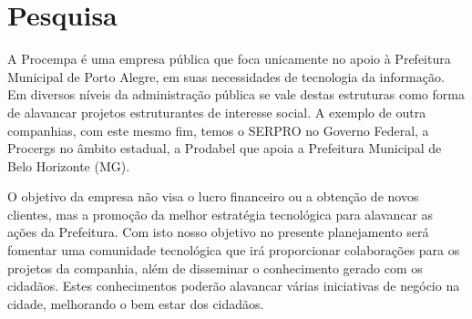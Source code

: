 \chapter{Pesquisa}
A Procempa é uma empresa pública que foca unicamente no apoio à Prefeitura Municipal de Porto Alegre, em suas necessidades de tecnologia da informação. Em diversos níveis da administração pública se vale destas estruturas como forma de alavancar projetos estruturantes de interesse social. A exemplo de outra companhias, com este mesmo fim, temos o SERPRO no Governo Federal, a Procergs no âmbito estadual, a Prodabel que apoia a Prefeitura Municipal de Belo Horizonte (MG).

O objetivo da empresa não visa o lucro financeiro ou a obtenção de novos clientes, mas a promoção da melhor estratégia tecnológica para alavancar as ações da Prefeitura. Com isto nosso objetivo no presente planejamento será fomentar uma comunidade tecnológica que irá proporcionar colaborações para os projetos da companhia, além de disseminar o conhecimento gerado com os cidadãos. Estes conhecimentos poderão alavancar várias iniciativas de negócio na cidade, melhorando o bem estar dos cidadãos.

